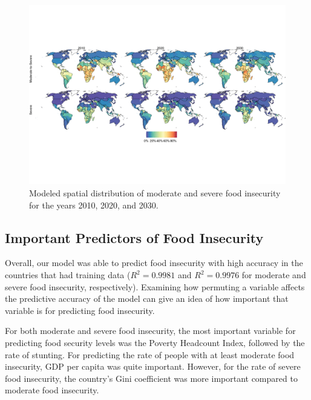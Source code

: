 \documentclass{article}
\begin{document}
\begin{landscape}
\begin{figure}[h]
  \centering
  \includegraphics{img/FullMap.png}
  \caption{Modeled spatial distribution of moderate and severe food insecurity for the years 2010, 2020, and 2030.}
  \label{fig:map}
\end{figure}
\end{landscape}

\subsection{Important Predictors of Food Insecurity}
Overall, our model was able to predict food insecurity with high accuracy in the countries that had training data ($R^2 = 0.9981$ and $R^2 = 0.9976$ for moderate and severe food insecurity, respectively).  Examining how permuting a variable affects the predictive accuracy of the model can give an idea of how important that variable is for predicting food insecurity.  

For both moderate and severe food insecurity, the most important variable for predicting food security levels was the Poverty Headcount Index, followed by the rate of stunting.  For predicting the rate of people with at least moderate food insecurity, GDP per capita was quite important.  However, for the rate of severe food insecurity, the country's Gini coefficient was more important compared to moderate food insecurity.
\end{document}
